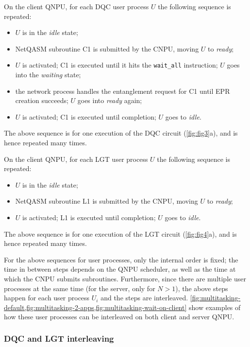 On the client \ac{QNPU}, for each \ac{DQC} user process $U$ the following sequence is repeated:
%
\begin{itemize}
    \item $U$ is in the \textit{idle} state;
    \item \ac{NetQASM} subroutine C1 is submitted by the \ac{CNPU}, moving $U$ to \textit{ready};
    \item $U$ is activated; C1 is executed until it hits the \texttt{wait\_all} instruction; $U$ goes into the \textit{waiting} state;
    \item the network process handles the entanglement request for C1 until \ac{EPR} creation succeeds; $U$ goes into \textit{ready} again;
    \item $U$ is activated; C1 is executed until completion; $U$ goes to \textit{idle}.
\end{itemize}
%
The above sequence is for one execution of the \ac{DQC} circuit (\cref{fig:fig3}a), and is hence repeated many times.

On the client \ac{QNPU}, for each \ac{LGT} user process $U$ the following sequence is repeated:
%
\begin{itemize}
    \item $U$ is in the \textit{idle} state;
    \item \ac{NetQASM} subroutine L1 is submitted by the \ac{CNPU}, moving $U$ to \textit{ready};
    \item $U$ is activated; L1 is executed until completion; $U$ goes to \textit{idle}.
\end{itemize}
%
The above sequence is for one execution of the \ac{LGT} circuit (\cref{fig:fig4}a), and is hence repeated many times.

For the above sequences for user processes, only the internal order is fixed; the time in between steps depends on the \ac{QNPU} scheduler, as well as the time at which the \ac{CNPU} submits subroutines. Furthermore, since there are multiple user processes at the same time (for the server, only for $N > 1$), the above steps happen for each user process $U_i$ and the steps are interleaved. \cref{fig:multitasking-default,fig:multitasking-2-apps,fig:multitasking-wait-on-client} show examples of how these user processes can be interleaved on both client and server \ac{QNPU}.

\subsubsection{DQC and LGT interleaving}

